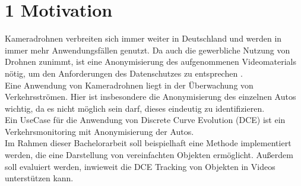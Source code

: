 \documentclass[a4paper,11pt,pdftex, parskip]{scrreprt}
\begin{document}
\begin{titlepage}
   
    \author{ 
        Erstgutachter: Prof. Dr. Reinhard Moratz \\
        Zweitgutachter: Dr. Christian Knoth \\
        Ausgabetermin: tbd. \\
        \vspace{0.75cm}
        Abgabetermin: tbd. \\
        Vorgelegt von: Timo Lietmeyer \\
        Geboren am : 23.05.1999 \\
        E-Mail-Adresse: timolietmeyer@uni-muenster.de \\
        Matrikelnummer: 459 169 \\
        Studiengang: Bachelor Geoinformatik
    }
    \date{ }    
\end{titlepage}
\maketitle

\section*{1 Motivation}
Kameradrohnen verbreiten sich immer weiter in Deutschland und werden in immer mehr Anwendungsfällen genutzt. Da auch die gewerbliche Nutzung von Drohnen zunimmt, ist eine Anonymisierung des aufgenommenen Videomaterials nötig, um den Anforderungen des Datenschutzes zu entsprechen \citep{Nehring2021}. \\
Eine Anwendung von Kameradrohnen liegt in der Überwachung von Verkehrsströmen. Hier ist insbesondere die Anonymisierung des einzelnen Autos wichtig, da es nicht möglich sein darf, dieses eindeutig zu identifizieren. \\
Ein UseCase für die Anwendung von Discrete Curve Evolution (DCE) ist ein Verkehrsmonitoring mit Anonymisierung der Autos. \\
Im Rahmen dieser Bachelorarbeit soll beispielhaft eine Methode implementiert werden, die eine Darstellung von vereinfachten Objekten ermöglicht. Außerdem soll evaluiert werden, inwieweit die DCE Tracking von Objekten in Videos unterstützen kann.
\end{document}
